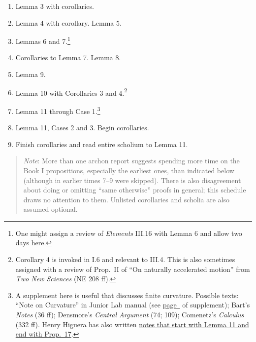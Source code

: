 \documentclass[10pt]{article}
\begin{document}
\begin{enumerate}[resume*] \item Lemma 3 with
		corollaries.  \item Lemma 4 with corollary.
		Lemma 5.  \item Lemmas 6 and 7.\footnote{One
			might assign a review of
			\emph{Elements} III.16 with Lemma 6
			and allow two days here.} \item
		Corollaries to Lemma 7. Lemma 8.  \item
		Lemma 9.  \item Lemma 10 with Corollaries 3
		and 4.\footnote{Corollary 4 is invoked in
			I.6 and relevant to III.4. This is
			also sometimes assigned with a
			review of Prop.~II of ``On naturally
			accelerated motion'' from \emph{Two
				New Sciences} (NE 208 ff).}
	\item Lemma 11 through Case 1.\footnote{A supplement
			here is useful that discusses finite
			curvature. Possible texts: ``Note on
			Curvature'' in Junior Lab manual
			(see
			\hyperref[supple.74]{page~\pageref{supple.74}}
			of supplement); Bart's \emph{Notes}
			(36 ff); Densmore's \emph{Central
				Argument} (74; 109);
			Comenetz's \emph{Calculus} (332 ff).
			Henry Higuera has also written
			\href{https://drive.google.com/file/d/1YZfQPV6poJMzZvZ3DyGfJopGkzy7oe7K/view?usp=sharing}{notes
			that start with Lemma 11 and
			end with Prop.~17}.}
	\item Lemma 11,
		Cases 2 and 3.  Begin corollaries.  \item
		Finish corollaries and read entire scholium
		to Lemma 11.  \end{enumerate}
		\begin{quote}
		\vspace{-0.5em}
	{\small \emph{Note}: More than one archon report
		suggests spending more time on the Book I
		propositions, especially the earliest ones,
		than indicated below (although in earlier
		times 7--9 were skipped).  There is also
		disagreement about doing or omitting ``same
		otherwise'' proofs in general; this schedule
		draws no attention to them. Unlisted
		corollaries and scholia are also assumed
		optional.
		
		} \end{quote}
\end{document}
